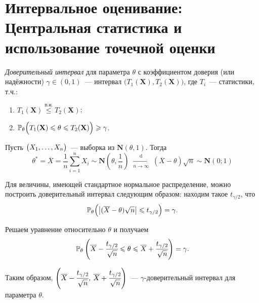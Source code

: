 \section{Интервальное оценивание: Центральная статистика и использование точечной оценки}

\begin{defn}
    \textit{Доверительный интервал} для параметра $\theta$ с коэффициентом доверия (или надёжности) $\gamma \in (0, 1)$~--- интервал $\bigl(T_1(\mathbf{X}), T_2(\mathbf{X})\bigr)$, где $T_i$~--- статистики, т.ч.:
    \begin{enumerate}
        \item $T_1(\mathbf{X}) \overset{\text{п.н.}}{\leqslant} T_2({\mathbf{X}})$;
        \item $\mathbb{P}_{\theta} \Bigl(T_1(\mathbf{X}) \leqslant \theta \leqslant T_2(\mathbf{X}) \Bigr) \geqslant \gamma$.
    \end{enumerate}
\end{defn}

\begin{exmp}
    Пусть $\bigl( X_1, \ldots, X_n \bigr)$~--- выборка из $\mathbf{N}(\theta, 1)$. Тогда
    \begin{equation*}
        \theta^{*}
        = \overline{X}
        = \frac{1}{n} \sum\limits_{i=1}^{n} X_{i} \sim \mathbf{N}\left(\theta, \frac{1}{n}\right)
        \; \xrightarrow[n \to \infty]{\text{d}} \; (\overline{X}-\theta) \sqrt{n} \sim \mathbf{N}(0;1)
    \end{equation*}

    Для величины, имеющей стандартное нормальное распределение, можно построить доверительный интервал следующим образом: находим такое $t_{\gamma / 2}$, что
    \begin{equation*}
        \mathbb{P}_{\theta}\Bigl(\bigl|(\overline{X}-\theta) \sqrt{n}\bigr| \leqslant t_{\gamma / 2}\Bigr) = \gamma.
    \end{equation*}

    Решаем уравнение относительно $\theta$ и получаем
    \begin{equation*}
        \mathbb{P}_{\theta}\left(\overline{X}-\cfrac{t_{\gamma / 2}}{\sqrt{n}} \leqslant \theta \leqslant \overline{X}+\cfrac{t_{\gamma / 2}}{\sqrt{n}}\right)=\gamma.
    \end{equation*}

    Таким образом, $ \left(\overline{X}-\cfrac{t_{\gamma / 2}}{\sqrt{n}}, \: \overline{X}+\cfrac{t_{\gamma / 2}}{\sqrt{n}} \right)$~--- $\gamma$-доверительный интервал для параметра $\theta$.
\end{exmp}


